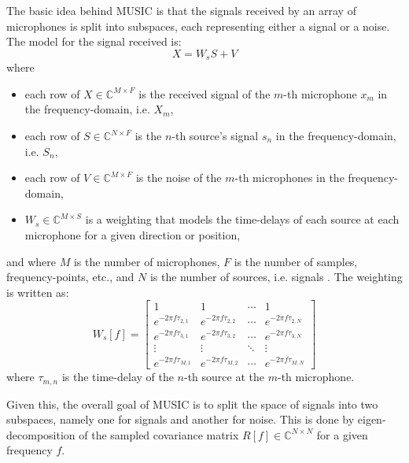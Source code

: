\documentclass[notitlepage]{report}
\begin{document}
The basic idea behind MUSIC is that the signals received by an array of microphones is split into subspaces, each representing either a signal or a noise. The model for the signal received is:
\begin{equation}
X = W_s S + V
\end{equation}
where 
\begin{itemize}
	\item each row of $X\in \mathbb{C}^{M\times F}$ is the received signal of the $m$-th microphone $x_m$ in the frequency-domain, i.e. $X_m$,
	\item each row of $S\in \mathbb{C}^{N\times F}$ is the $n$-th source's signal $s_n$ in the frequency-domain, i.e. $S_n$,
	\item each row of $V\in \mathbb{C}^{M\times F}$ is the noise of the $m$-th microphones in the frequency-domain,
	\item $W_s\in \mathbb{C}^{M\times S}$ is a weighting that models the time-delays of each source at each microphone for a given direction or position,
\end{itemize}
and where $M$ is the number of microphones, $F$ is the number of samples, frequency-points, etc., and $N$ is the number of sources, i.e. signals \cite{rascon_localization_2017}. The weighting is written as:
\begin{equation}
W_s[f] = 
\begin{bmatrix}
	1 						& 1						& \cdots		& 1						\\
	e^{-2\pi f\tau_{2,1}}	& e^{-2\pi f\tau_{2,2}}	& \cdots		& e^{-2\pi f\tau_{2,N}}	\\
	e^{-2\pi f\tau_{3,1}}	& e^{-2\pi f\tau_{3,2}}	& \cdots		& e^{-2\pi f\tau_{3,N}}	\\
	\vdots					& \vdots					& \ddots		& \vdots					\\
	e^{-2\pi f\tau_{M,1}}	& e^{-2\pi f\tau_{M,2}}	& \cdots		& e^{-2\pi f\tau_{M,N}}
\end{bmatrix}
\end{equation}
where $\tau_{m,n}$ is the time-delay of the $n$-th source at the $m$-th microphone.

Given this, the overall goal of MUSIC is to split the space of signals into two subspaces, namely one for signals and another for noise. This is done by eigen-decomposition of the sampled covariance matrix $R[f]\in \mathbb{C}^{N\times N}$ for a given frequency $f$.
\end{document}
